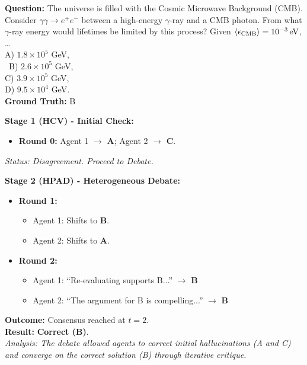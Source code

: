 \documentclass[11pt]{article}
\begin{document}
\begin{tcolorbox}[
    enhanced, breakable, width=\linewidth,
    colback=blue!5, colframe=blue!40!black, %
    title=\textbf{Case 2: Resolution via Debate (Medium Task) - GPQA ID 6},
    fonttitle=\bfseries\small
]
\textbf{Question:}
The universe is filled with the Cosmic Microwave Background (CMB). Consider
$\gamma\gamma\rightarrow e^{+}e^{-}$ between a high-energy $\gamma$-ray and a CMB photon.
From what $\gamma$-ray energy would lifetimes be limited by this process?
Given $\langle \epsilon_{\rm CMB}\rangle = 10^{-3}\,\mathrm{eV}$, \dots\ 
\\A) $1.8\times10^{5}$ GeV,\\\
B) $2.6\times10^{5}$ GeV,\\
C) $3.9\times10^{5}$ GeV,\\
D) $9.5\times10^{4}$ GeV.\\
\textbf{Ground Truth:} B

\vspace{4pt}
\textbf{Stage 1 (HCV) - Initial Check:}
\begin{itemize}[leftmargin=1.5em, nosep]
    \item \textbf{Round 0:} Agent 1 $\to$ \textbf{A}; Agent 2 $\to$ \textbf{C}.
\end{itemize}
\textit{Status: Disagreement. Proceed to Debate.}

\vspace{4pt}
\textbf{Stage 2 (HPAD) - Heterogeneous Debate:}
\begin{itemize}[leftmargin=1.5em, nosep]
    \item \textbf{Round 1:} 
    \begin{itemize}[nosep]
        \item Agent 1: Shifts to \textbf{B}.
        \item Agent 2: Shifts to \textbf{A}.
    \end{itemize}
    \item \textbf{Round 2:}
    \begin{itemize}[nosep]
        \item Agent 1: ``Re-evaluating supports B...'' $\to$ \textbf{B}
        \item Agent 2: ``The argument for B is compelling...'' $\to$ \textbf{B}
    \end{itemize}
\end{itemize}

\vspace{4pt}
\textbf{Outcome:} Consensus reached at $t=2$. \\
\textbf{Result:} \textcolor{green!60!black}{\textbf{Correct (B)}}. \\
\textit{Analysis: The debate allowed agents to correct initial hallucinations (A and C) and converge on the correct solution (B) through iterative critique.}
\end{tcolorbox}
\end{document}
